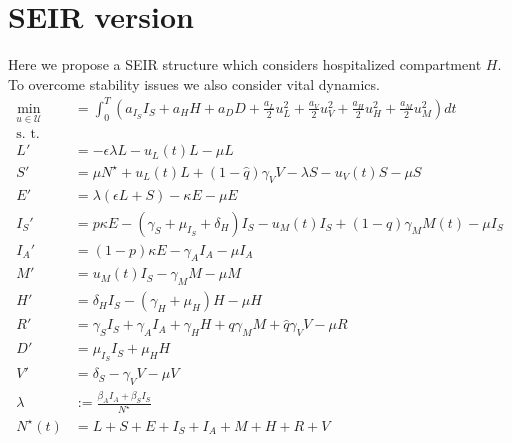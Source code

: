 \documentclass[a4paper,10pt]{amsart}
\begin{document}
    \section{SEIR version}
       Here we propose a SEIR structure which considers hospitalized
    compartment $ H $. To overcome stability issues we also consider
    vital dynamics.
    \begin{equation}
        \label{eqn:vital_dynamics}
        \begin{aligned}
            \min_{u \in \mathcal{U}} &=
            \int_{0}^T
                \left(
                    a_{I_S} I_S
                    + a_{H} H
                    + a_{D} D
                    +
                    \frac{a_{L}}{2}  u_L ^ 2
                    +
                    \frac{a_{V}}{2} u_V ^ 2
                    +
                    \frac{a_{H}}{2} u_H ^ 2
                    +
                    \frac{a_{M}}{2} u_M ^ 2
                \right)
                dt
            \\
            \text{s. t.}
            \\
            L' & =
                -\epsilon \lambda L - u_L(t) L - \mu L
            \\
            S' & =
                \mu N^\star + u_L(t) L + (1 - \widehat{q}) \gamma_V V
                - \lambda S - u_V(t) S - \mu S
            \\
            E' & =
                \lambda (\epsilon L + S) - \kappa E - \mu E
            \\
            I_S' & =
                p \kappa E - (\gamma_S + \mu_{I_S} + \delta_H) I_S
                - u_M(t) I_S + (1 - q) \gamma_M M(t)
                - \mu I_S
            \\
            I_A' &=
                (1 - p) \kappa E - \gamma_A I_A - \mu I_A
            \\
            M' &=
                u_M(t) I_S - \gamma_M M - \mu M
            \\
            H' &=
                \delta_H I_S - (\gamma_H + \mu_H) H  - \mu H
            \\
            R' & =
                \gamma_S I_S + \gamma_A I_A + \gamma_H H + q \gamma_M M
                + \widehat{q} \gamma_V V - \mu R
            \\
            D' &=
                \mu_{I_S} I_S + \mu_H H
            \\
            V' &=
                \delta_ S  - \gamma_V  V  - \mu V
            \\
            \lambda &:=
                \frac{\beta_A I_A + \beta_S I_S}{N^{\star}}
            \\
            N^{\star}(t) &=
                L + S +E + I_S + I_A +
                M + H + R + V
        \end{aligned}
    \end{equation}
	
\end{document}
